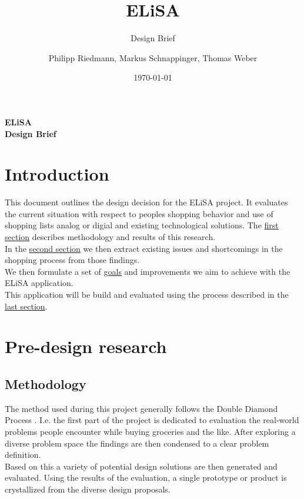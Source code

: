 \documentclass{scrartcl}
\title{ELiSA}
\subtitle{Design Brief}
\date{\today}
\author{Philipp Riedmann, Markus Schnappinger, Thomas Weber}
\begin{document}
\begin{titlepage}
   \begin{center}
      \LARGE\textbf{ELiSA}\\
      \vspace{0.75cm}
      \large\textbf{Design Brief}
   \end{center}
\end{titlepage}

\section{Introduction}
This document outlines the design decision for the ELiSA project.
It evaluates the current situation with respect to peoples shopping behavior and use of shopping lists analog or digial and existing technological solutions.
The \hyperref[sec:research]{first section} describes methodology and results of this research. \\

In the \hyperref[sec:problem]{second section} we then extract existing issues and shortcomings in the shopping process from those findings.\\

We then formulate a set of \hyperref[sec:goal]{goals} and improvements we aim to achieve with the ELiSA application.\\

This application will be build and evaluated using the process described in the \hyperref[sec:process]{last section}.

\section{Pre-design research}
\label{sec:research}
  \subsection{Methodology}
    The method used during this project generally follows the Double Diamond Process \cite{TODO}. I.e. the first part of the project is dedicated to evaluation the real-world problems people encounter while buying groceries and the like. After exploring a diverse problem space the findings are then condensed to a clear problem definition.\\
    Based on this a variety of potential design solutions are then generated and evaluated. Using the results of the evaluation, a single prototype or product is crystallized from the diverse design proposals.\\
\end{document}
